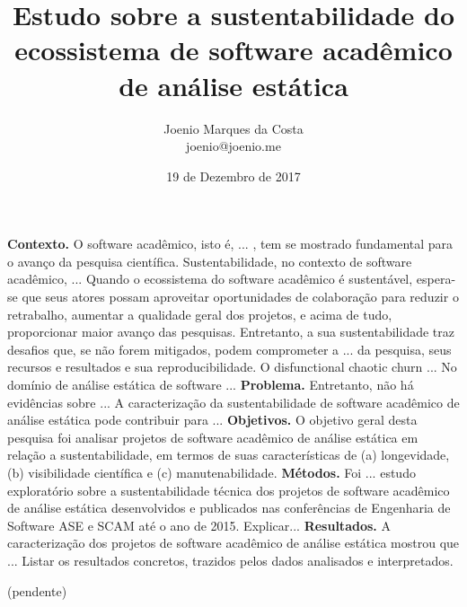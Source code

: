 \documentclass[msc, classic, a4paper]{ufbathesis}
\date{19 de Dezembro de 2017}
\title{
  Estudo sobre a sustentabilidade do ecossistema de software acadêmico de
  análise estática
}
\author{Joenio Marques da Costa\\
  {\small joenio@joenio.me}
}
\begin{document}
\frontpage
\frontmatter
\presentationpage

\resumo

\textbf{Contexto.} 
O software acadêmico, isto é, ... ,
tem se mostrado fundamental para o avanço da pesquisa científica.
%
Sustentabilidade, no contexto de software acadêmico,  ...
%
Quando o ecossistema do software acadêmico é sustentável, espera-se que seus atores possam aproveitar
oportunidades de colaboração para reduzir o retrabalho, aumentar a qualidade
geral dos projetos, e acima de tudo, proporcionar maior avanço das pesquisas.
%
Entretanto, a sua sustentabilidade traz desafios que, se não forem mitigados,
podem comprometer a ... da pesquisa, seus recursos e resultados e sua reproducibilidade.
%
O disfunctional chaotic churn ...
%
No domínio de análise estática de software ...
%
\textbf{Problema.} 
Entretanto, não há evidências sobre ...
A caracterização da sustentabilidade de software acadêmico 
de análise estática pode contribuir para ...
%
\textbf{Objetivos.}
O objetivo geral desta pesquisa foi analisar projetos de software acadêmico de análise estática 
em relação a sustentabilidade, em termos de suas características de 
(a) longevidade, (b) visibilidade científica e (c) manutenabilidade.
%
\textbf{Métodos.}
Foi ... estudo exploratório sobre a sustentabilidade
técnica dos projetos de software acadêmico de análise estática desenvolvidos e
publicados nas conferências de Engenharia de Software ASE e SCAM até o ano de
2015.
Explicar...
%
\textbf{Resultados.}
A caracterização dos projetos de software acadêmico de análise estática
mostrou que ...
Listar os resultados concretos, trazidos pelos dados analisados e interpretados.

\begin{keywords}

  (pendente)

\end{keywords}
\end{document}
